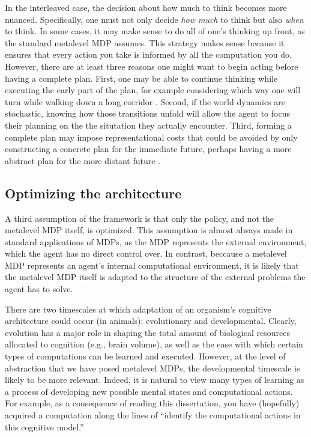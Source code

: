 In the interleaved case, the decision about how much to think becomes more nuanced. Specifically, one must not only decide \emph{how much} to think but also \emph{when} to think. In some cases, it may make sense to do all of one's thinking up front, as the standard metalevel MDP assumes. This strategy makes sense because it ensures that every action you take is informed by all the computation you do. However, there are at least three reasons one might want to begin acting before having a complete plan. First, one may be able to continue thinking while executing the early part of the plan, for example considering which way one will turn while walking down a long corridor \citep{oceallaigh2015metareasoning}. Second, if the world dynamics are stochastic, knowing how those transitions unfold will allow the agent to focus their planning on the the situtation they actually encounter. Third, forming a complete plan may impose representational costs that could be avoided by only constructing a concrete plan for the immediate future, perhaps having a more abstract plan for the more distant future \citep{ho2020efficiency}.


\subsection{Optimizing the architecture}

A third assumption of the framework is that only the policy, and not the metalevel MDP itself, is optimized. This assumption is almost always made in standard applications of MDPs, as the MDP represents the external environment, which the agent has no direct control over. In contrast, beccause a metalevel MDP represents an agent's internal computational environment, it is likely that the metalevel MDP itself is adapted to the structure of the external problems the agent has to solve.

There are two timescales at which adaptation of an organism's cognitive architecture could occur (in animals): evolutionary and developmental. Clearly, evolution has a major role in shaping the total amount of biological resources allocated to cognition (e.g., brain volume), as well as the ease with which certain types of computations can be learned and executed. However, at the level of abstraction that we have posed metalevel MDPs, the developmental timescale is likely to be more relevant. Indeed, it is natural to view many types of learning as a process of developing new possible mental states and computational actions. For example, as a consequence of reading this dissertation, you have (hopefully) acquired a computation along the lines of ``identify the computational actions in this cognitive model.''

